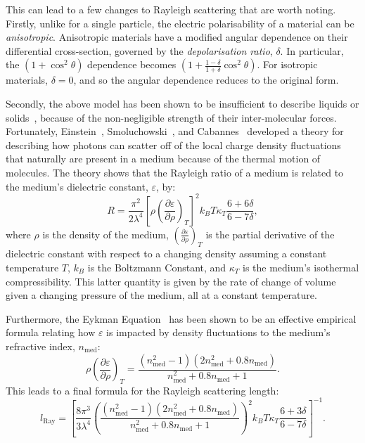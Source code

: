 This can lead to a few changes to Rayleigh scattering that are worth noting. Firstly, unlike for a single particle, the electric polarisability of a material can be \textit{anisotropic}. Anisotropic materials have a modified angular dependence on their differential cross-section, governed by the \textit{depolarisation ratio}, $\delta$. In particular, the $\left(1+\cos^{2}\theta\right)$ dependence becomes $\left(1+\frac{1-\delta}{1+\delta}\cos^{2}\theta\right)$. For isotropic materials, $\delta=0$, and so the angular dependence reduces to the original form.

Secondly, the above model has been shown to be insufficient to describe liquids or solids~\cite{JerlovNilsGunnar1974Oaoo}, %
because of the non-negligible strength of their inter-molecular forces. Fortunately, Einstein~\cite{einsteinTheoryOpalescenceHomogeneous1910}, %
Smoluchowski~\cite{smoluchowskiMolecularKineticTheory1908}, %
and Cabannes~\cite{cabannesRelationshipDegreePolarisation1920} %
developed a theory for describing how photons can scatter off of the local charge density fluctuations that naturally are present in a medium because of the thermal motion of molecules. The theory shows that the Rayleigh ratio of a medium is related to the medium's dielectric constant, $\varepsilon$, by:
\begin{equation}
    R = \frac{\pi^{2}}{2\lambda^{4}}\left[\rho\left(\frac{\partial\varepsilon}{\partial\rho}\right)_{T}\right]^{2} k_{B}T \kappa_{T}\frac{6+6\delta}{6-7\delta},
\end{equation}
where $\rho$ is the density of the medium, $\left(\frac{\partial\varepsilon}{\partial\rho}\right)_{T}$ is the partial derivative of the dielectric constant with respect to a changing density assuming a constant temperature $T$, $k_{B}$ is the Boltzmann Constant, and $\kappa_{T}$ is the medium's isothermal compressibility. This latter quantity is given by the rate of change of volume given a changing pressure of the medium, all at a constant temperature.

Furthermore, the Eykman Equation~\cite{eykmanRecherchesRefractometriquesSuite1895,zhouRayleighScatteringLinear2015} %
has been shown to be an effective empirical formula relating how $\varepsilon$ is impacted by density fluctuations to the medium's refractive index, $n_{\textrm{med}}$:
\begin{equation}
    \rho\left(\frac{\partial\varepsilon}{\partial\rho}\right)_{T} = 
    \frac{\left(n_{\textrm{med}}^{2}-1\right)\left(2n_{\textrm{med}}^{2}+0.8n_{\textrm{med}}\right)}{n_{\textrm{med}}^{2}+0.8n_{\textrm{med}}+1}.
\end{equation}
This leads to a final formula for the Rayleigh scattering length:
\begin{equation}
    l_{\mathrm{Ray}} = \left[
        \frac{8\pi^{3}}{3\lambda^{4}}
        \left(
            \frac{\left(n_{\textrm{med}}^{2}-1\right)\left(2n_{\textrm{med}}^{2}+0.8n_{\textrm{med}}\right)}{n_{\textrm{med}}^{2}+0.8n_{\textrm{med}}+1}
        \right)^2
        k_{B}T \kappa_{T}\frac{6+3\delta}{6-7\delta}
        \right]^{-1}.
\end{equation}

